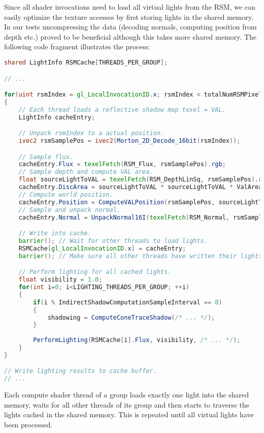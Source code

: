 \documentclass[thesis.tex]{subfiles}
\begin{document}
Since all shader invocations need to load all virtual lights from the RSM, we can easily optimize the texture accesses by first storing lights in the shared memory.
In our tests uncompressing the data (decoding normals, computing position from depth etc.) proved to be beneficial although this takes more shared memory.
The following code fragment illustrates the process:
\begin{lstlisting}[language=GLSL]
shared LightInfo RSMCache[THREADS_PER_GROUP];

// ...

for(uint rsmIndex = gl_LocalInvocationID.x; rsmIndex < totalNumRSMPixels; rsmIndex += THREADS_PER_GROUP)
{
	// Each thread loads a reflective shadow map texel = VAL.
	LightInfo cacheEntry;

	// Unpack rsmIndex to a actual position.
	ivec2 rsmSamplePos = ivec2(Morton_2D_Decode_16bit(rsmIndex)); 

	// Sample flux.
	cacheEntry.Flux = texelFetch(RSM_Flux, rsmSamplePos).rgb;
	// Sample depth and compute VAL area.
	float sourceLightToVAL = texelFetch(RSM_DepthLinSq, rsmSamplePos).r;
	cacheEntry.DiscArea = sourceLightToVAL * sourceLightToVAL * ValAreaFactor;
	// Compute world position.
	cacheEntry.Position = ComputeVALPosition(rsmSamplePos, sourceLightToVAL);
	// Sample and unpack normal.
	cacheEntry.Normal = UnpackNormal16I(texelFetch(RSM_Normal, rsmSamplePos).xy);

	// Write into cache.
	barrier(); // Wait for other threads to load lights.
 	RSMCache[gl_LocalInvocationID.x] = cacheEntry;
	barrier(); // Make sure all other threads have written their lights.

	// Perform lighting for all cached lights.
	float visibility = 1.0;
	for(int i=0; i<LIGHTING_THREADS_PER_GROUP; ++i)
	{
		if(i % IndirectShadowComputationSampleInterval == 0)
		{
			shadowing = ComputeConeTraceShadow(/* ... */);
		}
		
		PerformLighting(RSMCache[i].Flux, visibility, /* ... */);
	}
}

// Write lighting results to cache buffer.
// ...
\end{lstlisting}
Each compute shader thread of a group loads exactly one light into the shared memory, waits for all other threads of its group and then starts to traverse the lights cached in the shared memory.
This is repeated until all virtual lights have been processed.
\end{document}
